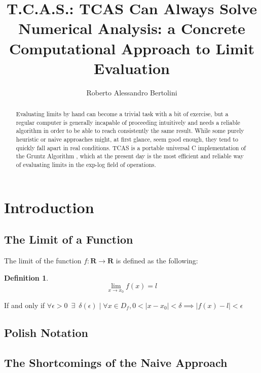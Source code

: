 \documentclass{article}
\title{\textbf{T.C.A.S.}: \textbf{T}CAS \textbf{C}an \textbf{A}lways \textbf{S}olve \\
		\large Numerical Analysis: a Concrete Computational Approach to Limit Evaluation}
\author{Roberto Alessandro Bertolini}
\date{}
\affil{Liceo Nervi Ferrari - Morbegno}
\theoremstyle{plain}
\theoremstyle{definition}
\newtheorem{defn}[thm]{Definition}
\begin{document}
	\maketitle
	
	\begin{abstract}
		Evaluating limits by hand can become a trivial task with a bit of exercise, but a regular computer is generally incapable of proceeding intuitively and needs a reliable algorithm in order to be able to reach consistently the same result. 
		While some purely heuristic or naive approaches might, at first glance, seem good enough, they tend to quickly fall apart in real conditions. TCAS is a portable universal C implementation of the Gruntz Algorithm \cite{gruntz}, which at the present day is the most efficient and reliable way of evaluating limits in the exp-log field of operations.
	\end{abstract}

	\tableofcontents
	
	\newpage	
	
	\section{Introduction}
	
	\subsection{The Limit of a Function}
	
	The limit of the function $ f: \mathbf{R} \rightarrow \mathbf{R} $ is defined as the following:
	
	\begin{defn}
		\[ 
		\lim_{x \rightarrow x_{0}}{f(x) = l} 
		 \]
		 
		 If and only if \( 
		 \forall \epsilon > 0 \enspace \exists \enspace \delta(\epsilon) \mid \forall x \in D_{f}, 0 < \mid x - x_{0} \mid < \delta \implies \mid f(x) - l \mid < \epsilon
		  \)
	\end{defn}
	
	\subsection{Polish Notation}
	
	
	
	\subsection{The Shortcomings of the Naive Approach}
	
\end{document}

